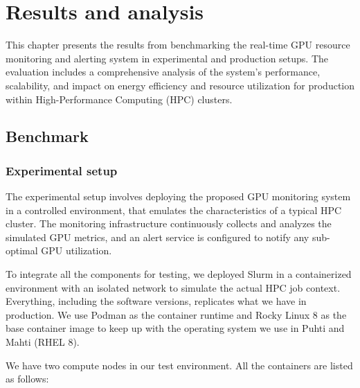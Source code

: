 \chapter{Results and analysis}
\label{chap:result}
This chapter presents the results from benchmarking the real-time GPU resource monitoring and alerting system in experimental and production setups. The evaluation includes a comprehensive analysis of the system's performance, scalability, and impact on energy efficiency and resource utilization for production within High-Performance Computing (HPC) clusters.

\section{Benchmark}
\subsection{Experimental setup}
\label{subsection:experiment}
The experimental setup involves deploying the proposed GPU monitoring system in a controlled environment, that emulates the characteristics of a typical HPC cluster. The monitoring infrastructure continuously collects and analyzes the simulated GPU metrics, and an alert service is configured to notify any sub-optimal GPU utilization.

To integrate all the components for testing, we deployed Slurm in a containerized environment with an isolated network to simulate the actual HPC job context. Everything, including the software versions, replicates what we have in production. We use Podman as the container runtime and Rocky Linux 8 as the base container image to keep up with the operating system we use in Puhti and Mahti (RHEL 8).

We have two compute nodes in our test environment. All the containers are listed as follows:
 
